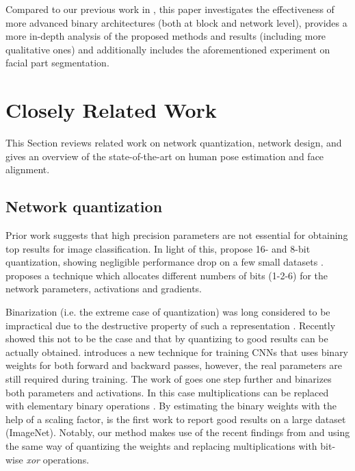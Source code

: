 \documentclass[10pt,journal,compsoc]{IEEEtran}
\begin{document}
Compared to our previous work in \cite{bulat2017binarized}, this paper investigates the effectiveness of more advanced binary architectures (both at block and network level), provides a more in-depth analysis of the proposed methods and results (including more qualitative ones) and additionally includes the aforementioned experiment on facial part segmentation.  











\section{Closely Related Work}\label{sec:related}

This Section reviews related work on network quantization, network design, and gives an overview of the state-of-the-art on human pose estimation and face alignment.

\subsection{Network quantization} Prior work \cite{holi1993finite} suggests that high precision parameters are not essential for obtaining top results for image classification. In light of this, \cite{courbariaux2014training, lin2015fixed} propose 16- and 8-bit quantization, showing negligible performance drop on a few small datasets \cite{krizhevsky2009learning}. \cite{zhou2016dorefa} proposes a technique which allocates different numbers of bits (1-2-6) for the network parameters, activations and gradients.

Binarization (i.e. the extreme case of quantization) was long considered to be impractical due to the destructive property of such a representation \cite{courbariaux2014training}. Recently \cite{soudry2014expectation} showed this not to be the case and that by quantizing to  good results can be actually obtained. \cite{courbariaux2015binaryconnect} introduces a new technique for training CNNs that uses binary weights for both forward and backward passes, however, the real parameters are still required during training.  The work of \cite{courbariaux2016binarized} goes one step further and binarizes both parameters and activations. In this case multiplications can be replaced with elementary binary operations \cite{courbariaux2016binarized}. By estimating the binary weights with the help of a scaling factor, \cite{rastegari2016xnor} is the first work to report good results on a large dataset (ImageNet). Notably, our method makes use of the recent findings from \cite{rastegari2016xnor} and \cite{courbariaux2016binarized} using the same way of quantizing the weights and replacing multiplications with bit-wise \textit{xor} operations.
\end{document}
